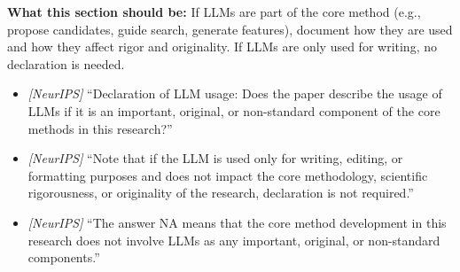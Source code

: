 \noindent\textbf{What this section should be:}
If LLMs are part of the core method (e.g., propose candidates, guide search, generate features), document how they are used and how they affect rigor and originality. If LLMs are only used for writing, no declaration is needed.
\begin{itemize}
  \item \textit{[NeurIPS]} ``Declaration of LLM usage: Does the paper describe the usage of LLMs if it is an important, original, or non-standard component of the core methods in this research?''
  \item \textit{[NeurIPS]} ``Note that if the LLM is used only for writing, editing, or formatting purposes and does not impact the core methodology, scientific rigorousness, or originality of the research, declaration is not required.''
  \item \textit{[NeurIPS]} ``The answer NA means that the core method development in this research does not involve LLMs as any important, original, or non-standard components.''
\end{itemize}